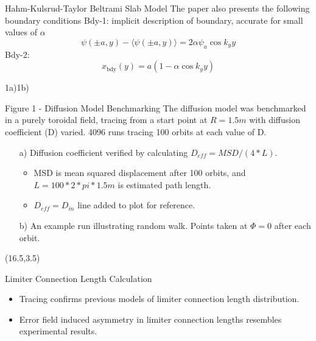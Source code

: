 \documentclass{beamer}
\begin{document}
\begin{frame}[t]
\begin{textblock}{15}
{\begin{block}{Hahm-Kulsrud-Taylor Beltrami Slab Model}
The paper also presents the following boundary conditions
Bdy-1: implicit description of boundary, accurate for small values of $\alpha$
\begin{equation}
    \label{eq:bdy1}
    \psi\left( \pm a, y \right) - \langle \psi\left( \pm a, y \right) \rangle = 2\alpha \psi_a \cos{k_y y}
\end{equation} 
Bdy-2: 
\begin{equation}
    \label{eq:bdy2}
    x_{\text{bdy}}\left( y \right) =a\left( 1-\alpha\cos{k_y y} \right) 
\end{equation} 

\end{block}
}

1a)\hspace{7.4in}1b)\break
\begin{block}{Figure 1 - Diffusion Model Benchmarking}
The diffusion model was benchmarked in a purely toroidal field, tracing from a start point at $R=1.5m$ with diffusion coefficient (D) varied.
4096 runs tracing 100 orbits at each value of D.
\begin{itemize}
\item[a)] Diffusion coefficient verified by calculating $D_{eff}=MSD/(4*L)$.
\begin{itemize}
\item MSD is mean squared displacement after 100 orbits, and $L=100*2*pi*1.5m$ is estimated path length.
\item $D_{eff}=D_{in}$ line added to plot for reference.
\end{itemize}
\item[b)] An example run illustrating random walk. Points taken at $\Phi=0$ after each orbit.
\end{itemize}
\end{block}
\end{textblock}



\begin{textblock}{15}(16.5,3.5)
{\Large
\begin{block}{Limiter Connection Length Calculation}
\begin{itemize}
\item Tracing confirms previous models of limiter connection length distribution\cite{pederson}.
\item Error field induced asymmetry in limiter connection lengths resembles experimental results.
\end{itemize}
\end{block}
}
\end{textblock}





\end{frame}
\end{document}
